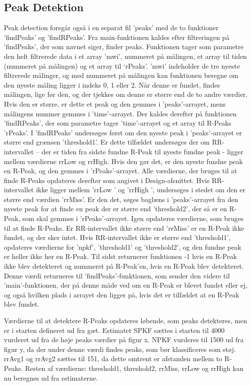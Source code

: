 \documentclass{article}
\begin{document}
\subsection{Peak Detektion}
Peak detection foregår også i en separat fil ’peaks’ med de to funktioner ’findPeaks’ og ’findRPeaks’. Fra main-funktionen kaldes efter filtreringen på ’findPeaks’, der som navnet siger, finder peaks. Funktionen tager som parametre den helt filtrerede data i et array ’mwi’, nummeret på målingen, et array til tiden (nummeret på målingen) og et array til ‘rPeaks’. ’mwi’ indeholder de tre nyeste filtrerede målinger, og med nummeret på målingen kan funktionen beregne om den nyeste måling ligger i indeks 0, 1 eller 2. Når denne er fundet, findes målingen, lige før den, og der tjekkes om denne er større end de to andre værdier. Hvis den er større, er dette et peak og den gemmes i ’peaks’-arrayet, mens målingens nummer gemmes i ’time’-arrayet. Der kaldes derefter på funktionen ’findRPeaks’, der som parametre tager ’time’-arrayet og et array til R-Peaks ’rPeaks’.
I ’findRPeaks’ undersøges først om den nyeste peak i ’peaks’-arrayet er større end grænsen ’threshold1’. Er dette tilfældet undersøges der om RR-intervallet – der er tiden fra sidste fundne R-Peak til nyeste fundne peak - ligger mellem værdierne rrLow og rrHigh. Hvis den gør det, er den nyeste fundne peak en R-Peak, og den gemmes i ’rPeaks’-arrayet. Alle værdierne, der bruges til at finde R-Peaks opdateres derefter som angivet i Design-afsnittet. Hvis RR-intervallet ikke ligger mellem ’rrLow ’ og ’rrHigh ’, undersøges i stedet om den er større end værdien ’rrMiss’. Er den det, søges baglæns i ’peaks’-arrayet fra den nyeste peak for at finde en peak der er større end ’threshold2’, der så er en R-Peak, som skal gemmes i ’rPeaks’-arrayet. Igen opdateres værdierne, som bruges til at finde R-Peaks. Er RR-intervallet ikke større end ’rrMiss’ er en R-Peak ikke fundet, og der sker intet. Hvis RR-intervallet ikke er større end ’threshold1’, opdateres værdierne for ’npkf’, ’threshold1’ og ’threshold2’, og den fundne peak er heller ikke her en R-Peak.  Til sidst returnerer funktionen -1 hvis en R-Peak ikke blev detekteret og nummeret på R-Peak’en, hvis en R-Peak blev detekteret. Denne værdi returneres til ’findPeaks’-funktionen, som sender den videre til ’main’-funktionen, der på denne måde ved om en R-Peak er blevet fundet eller ej, og også hvilken plads i arrayet den ligger på, hvis det er tilfældet at en R-Peak blev fundet.
 
Værdierne til at detektere R-Peaks opdateres løbende, som peaks detekteres, men er i starten defineret ud fra gæt. Estimatet SPKF sættes i starten til 4000 vurderet ud fra de høje peaks værdier på figur x. NPKF vurderes til 1500 ud fra figur y, da der under denne værdi findes peaks, som bør klassificeres som støj. rrAvg1 og rrAvg2 sættes til 151, da dette omtrent er afstanden mellem to R-Peaks. Resten af værdierne: threshold1, threshold2, rrMiss, rrLow og rrHigh kan nu beregnes ud fra estimaterne.
\end{document}
